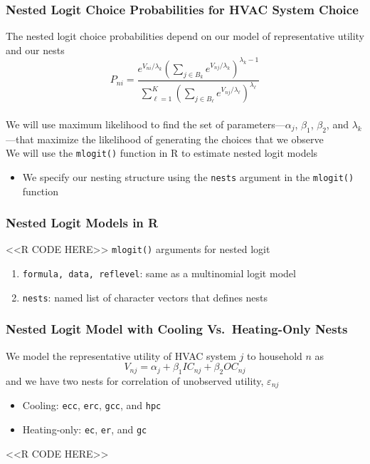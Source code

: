 \documentclass{beamer}
\begin{document}
\begin{frame}\frametitle{Nested Logit Choice Probabilities for HVAC System Choice}
    The nested logit choice probabilities depend on our model of representative utility and our nests
    $$P_{ni} = \frac{e^{V_{ni} / \lambda_k} \left( \sum_{j \in B_k} e^{V_{nj} / \lambda_k} \right)^{\lambda_k - 1}}{\sum_{\ell = 1}^K \left( \sum_{j \in B_{\ell}} e^{V_{nj} / \lambda_{\ell}} \right)^{\lambda_{\ell}}}$$ \\
    \vspace{2ex}
    We will use maximum likelihood to find the set of parameters---$\alpha_j$, $\beta_1$, $\beta_2$, and $\lambda_k$---that maximize the likelihood of generating the choices that we observe \\
    \vspace{2ex}
    We will use the \texttt{mlogit()} function in R to estimate nested logit models
	\begin{itemize}
		\item We specify our nesting structure using the \texttt{nests} argument in the \texttt{mlogit()} function
	\end{itemize}
\end{frame}

\begin{frame}[fragile]\frametitle{Nested Logit Models in R}
    <<R CODE HERE>>
    \vspace{2ex}
    \texttt{mlogit()} arguments for nested logit
    \begin{enumerate}
        \item \texttt{formula, data, reflevel}: same as a multinomial logit model
        \item \texttt{nests}: named list of character vectors that defines nests
    \end{enumerate}
\end{frame}

\begin{frame}[fragile]\frametitle{Nested Logit Model with Cooling Vs.\ Heating-Only Nests}
    We model the representative utility of HVAC system $j$ to household $n$ as
    $$V_{nj} = \alpha_j + \beta_1 IC_{nj} + \beta_2 OC_{nj}$$
    and we have two nests for correlation of unobserved utility, $\varepsilon_{nj}$
    \begin{itemize}
    	\item Cooling: \texttt{ecc}, \texttt{erc}, \texttt{gcc}, and \texttt{hpc}
    	\item Heating-only: \texttt{ec}, \texttt{er}, and \texttt{gc}
    \end{itemize}
    <<R CODE HERE>>
\end{frame}
\end{document}
